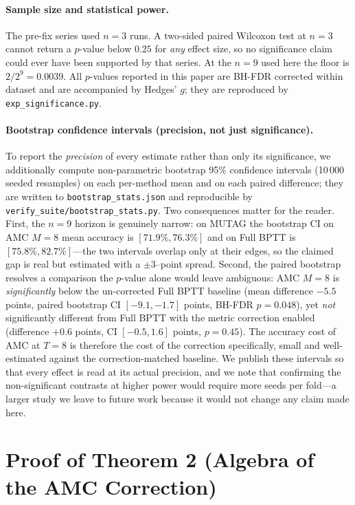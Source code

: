 \documentclass[a4paper,fleqn]{cas-dc}
\begin{document}
\paragraph{Sample size and statistical power.}
The pre-fix series used $n{=}3$ runs. A two-sided paired Wilcoxon test
at $n{=}3$ cannot return a $p$-value below $0.25$ for \emph{any} effect
size, so no significance claim could ever have been supported by that
series. At the $n{=}9$ used here the floor is $2/2^{9}=0.0039$. All
$p$-values reported in this paper are BH-FDR corrected within dataset
and are accompanied by Hedges' $g$; they are reproduced by
\texttt{exp\_significance.py}.

\paragraph{Bootstrap confidence intervals (precision, not just significance).}
To report the \emph{precision} of every estimate rather than only its
significance, we additionally compute non-parametric bootstrap 95\% confidence
intervals (10\,000 seeded resamples) on each per-method mean and on each paired
difference; they are written to \texttt{bootstrap\_stats.json} and reproducible
by \texttt{verify\_suite/bootstrap\_stats.py}. Two consequences matter for the
reader. First, the $n{=}9$ horizon is genuinely narrow: on MUTAG the bootstrap
CI on AMC $M{=}8$ mean accuracy is $[71.9\%,76.3\%]$ and on Full BPTT is
$[75.8\%,82.7\%]$---the two intervals overlap only at their edges, so the
claimed gap is real but estimated with a $\pm3$--point spread. Second, the
paired bootstrap resolves a comparison the $p$-value alone would leave ambiguous:
AMC $M{=}8$ is \emph{significantly} below the un-corrected Full BPTT baseline
(mean difference $-5.5$ points, paired bootstrap CI $[-9.1,-1.7]$ points,
BH-FDR $p{=}0.048$), yet \emph{not} significantly different from Full BPTT with
the metric correction enabled (difference $+0.6$ points, CI $[-0.5,1.6]$ points,
$p{=}0.45$). The accuracy cost of AMC at $T{=}8$ is therefore the cost of the
correction specifically, small and well-estimated against the correction-matched
baseline. We publish these intervals so that every effect is read at its actual
precision, and we note that confirming the non-significant contrasts at higher
power would require more seeds per fold---a larger study we leave to future work
because it would not change any claim made here.

\section{Proof of Theorem 2 (Algebra of the AMC Correction)}
\label{sec:theorem_proof}
\end{document}
